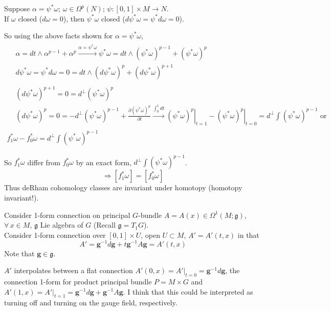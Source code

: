 \documentclass[10pt]{amsart}
\begin{document}
\begin{multicols}{2}
Suppose $\alpha = \psi^* \omega$; $\omega \in \Omega^p(N)$; $\psi : [0,1] \times M \to N$.  \\
If $\omega$ closed ($d\omega =0$), then $\psi^*\omega$ closed ($d\psi^* \omega = \psi^* d\omega =0$).  

So using the above facts shown for $\alpha = \psi^* \omega$,
\[
\begin{gathered}
\begin{aligned}
  & \alpha = dt \wedge \alpha^{p-1} + \alpha^p \xrightarrow{ \alpha = \psi^* \omega } \psi^* \omega = dt \wedge (\psi^* \omega)^{p-1} + (\psi^* \omega)^p \\ 
  &  d\psi^* \omega = \psi^* d\omega = 0 = dt \wedge (d\psi^* \omega)^p + (d\psi^* \omega)^{p+1}
\end{aligned} \\
\begin{aligned}
  &  (d\psi^* \omega)^{p+1} =0 = d^{\perp}(\psi^* \omega)^p \\ 
  & (d\psi^* \omega)^p = 0 = -d^{\perp}(\psi^* \omega)^{p-1} + \frac{ \partial ( \psi^* \omega)^p }{ \partial t} \xrightarrow{ \int_0^1 dt } \left. (\psi^* \omega)^p \right|_{t=1} - \left. (\psi^* \omega)^p \right|_{t=0} = d^{\perp} \int(\psi^* \omega)^{p-1} \text{ or } 
\end{aligned} \\
f_1^* \omega - f_0^* \omega = d^{\perp} \int (\psi^* \omega)^{p-1}
\end{gathered}
\]

So $f_1^* \omega$ differ from $f_0^* \omega$ by an exact form, $d^{\perp} \int(\psi^* \omega)^{p-1}$.  
\[
\Longrightarrow [f_1^* \omega] = [f_0^* \omega]
\]
Thus deRham cohomology classes are invariant under homotopy (homotopy invariant!).  

Consider 1-form connection on principal $G$-bundle $A=A(x) \in \Omega^1(M;\mathfrak{g})$, $\forall \, x \in M$, $\mathfrak{g}$ Lie algebra of $G$ (Recall $\mathfrak{g} = T_1G$).  \\
Consider 1-form connection over $[0,1] \times U$, open $U \subset M$, $A'=A'(t,x)$ in that
\[
A' = \mathbf{g}^{-1}d\mathbf{g} + t\mathbf{g}^{-1} A \mathbf{g} = A'(t,x)
\]
Note that $\mathbf{g} \in \mathfrak{g}$.  

$A'$ interpolates between a flat connection $A'(0,x) = \left. A' \right|_{t=0} = \mathbf{g}^{-1} d\mathbf{g}$, the connection 1-form for product principal bundle $P=M\times G$ and $A'(1,x) = \left. A'\right|_{t=1} = \mathbf{g}^{-1} d\mathbf{g} + \mathbf{g}^{-1} A \mathbf{g}$.  I think that this could be interpreted as turning off and turning on the gauge field, respectively.  


\end{multicols}
\end{document}
